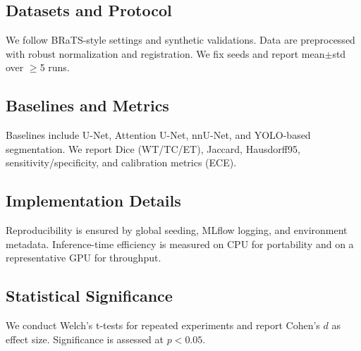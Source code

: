 \documentclass{article}
\begin{document}
\subsection{Datasets and Protocol}
We follow BRaTS-style settings and synthetic validations. Data are preprocessed with robust normalization and registration. We fix seeds and report mean$\pm$std over $\geq$5 runs.

\subsection{Baselines and Metrics}
Baselines include U-Net, Attention U-Net, nnU-Net, and YOLO-based segmentation. We report Dice (WT/TC/ET), Jaccard, Hausdorff95, sensitivity/specificity, and calibration metrics (ECE).

\subsection{Implementation Details}
Reproducibility is ensured by global seeding, MLflow logging, and environment metadata. Inference-time efficiency is measured on CPU for portability and on a representative GPU for throughput.

\subsection{Statistical Significance}
We conduct Welch's t-tests for repeated experiments and report Cohen's $d$ as effect size. Significance is assessed at $p<0.05$.
\end{document}
